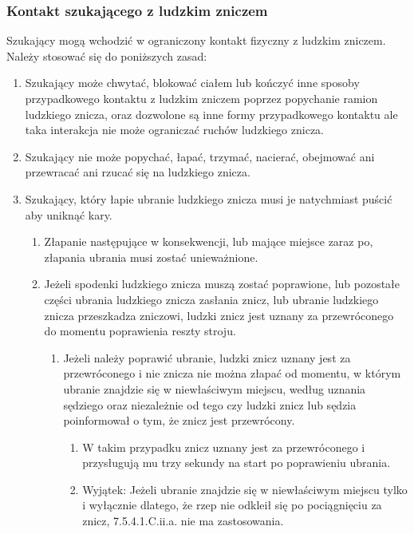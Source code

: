 \documentclass[12pt]{article}
\begin{document}
\subsubsection{Kontakt szukającego z ludzkim zniczem}

Szukający mogą wchodzić w ograniczony kontakt fizyczny z ludzkim
zniczem. Należy stosować się do poniższych zasad:

\begin{enumerate}
\item
    Szukający może chwytać, blokować ciałem lub kończyć inne sposoby
  przypadkowego kontaktu z ludzkim zniczem poprzez popychanie ramion
  ludzkiego znicza, oraz dozwolone są inne formy przypadkowego kontaktu
  ale taka interakcja nie może ograniczać ruchów ludzkiego znicza.
  \item
    Szukający nie może popychać, łapać, trzymać, nacierać, obejmować ani
  przewracać ani rzucać się na ludzkiego znicza.
  \item
    Szukający, który łapie ubranie ludzkiego znicza musi je natychmiast
  puścić aby uniknąć kary.
  
  \begin{enumerate}
  \item
        Złapanie następujące w konsekwencji, lub mające miejsce zaraz po,
    złapania ubrania musi zostać unieważnione.
      \item
        Jeżeli spodenki ludzkiego znicza muszą zostać poprawione, lub
    pozostałe części ubrania ludzkiego znicza zasłania znicz, lub
    ubranie ludzkiego znicza przeszkadza zniczowi, ludzki znicz jest
    uznany za przewróconego do momentu poprawienia reszty stroju.
    
    \begin{enumerate}
    \item
            Jeżeli należy poprawić ubranie, ludzki znicz uznany jest za
      przewróconego i nie znicza nie można złapać od momentu, w którym
      ubranie znajdzie się w niewłaściwym miejscu, według uznania
      sędziego oraz niezależnie od tego czy ludzki znicz lub sędzia
      poinformował o tym, że znicz jest przewrócony.
      
      \begin{enumerate}
      \item
                W takim przypadku znicz uznany jest za przewróconego i
        przysługują mu trzy sekundy na start po poprawieniu ubrania.
              \item
                Wyjątek: Jeżeli ubranie znajdzie się w niewłaściwym miejscu
        tylko i wyłącznie dlatego, że rzep nie odkleił się po
        pociągnięciu za znicz, 7.5.4.1.C.ii.a. nie ma zastosowania.
              \end{enumerate}
    \end{enumerate}
  \end{enumerate}
\end{enumerate}
\end{document}
